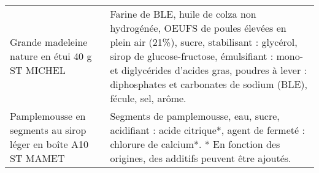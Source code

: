 \begin{longtable}{p{5cm}p{10cm}}
                                                           Grande madeleine nature en étui 40 g ST MICHEL &                                                                                                                                                                                                                                                                                                                                                                                                                                                                                                                                                                                                                                                                                                                                                 Farine de BLE, huile de colza non hydrogénée, OEUFS de poules élevées en plein air (21\%), sucre, stabilisant : glycérol, sirop de glucose-fructose, émulsifiant : mono- et diglycérides d'acides gras, poudres à lever : diphosphates et carbonates de sodium (BLE), fécule, sel, arôme. \\
                                            Pamplemousse en segments au sirop léger en boîte A10 ST MAMET &                                                                                                                                                                                                                                                                                                                                                                                                                                                                                                                                                                                                                                                                                                                                                                                                                                                             Segments de pamplemousse, eau, sucre, acidifiant : acide citrique*, agent de fermeté : chlorure de calcium*.  * En fonction des origines, des additifs peuvent être ajoutés. \\

\end{longtable}
